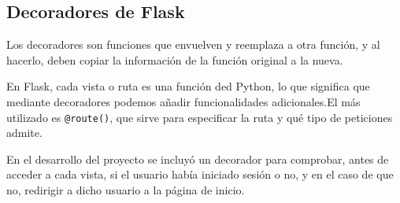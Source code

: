 \subsection{Decoradores de Flask}
Los decoradores son funciones que envuelven y reemplaza a otra función, y al hacerlo, deben copiar la información de la función original a la nueva.

En Flask, cada vista o ruta es una función ded Python, lo que significa que mediante decoradores podemos añadir funcionalidades adicionales.El más utilizado es \texttt{@route()}, que sirve para especificar la ruta y qué tipo de peticiones admite. 


En el desarrollo del proyecto se incluyó un decorador para comprobar, antes de acceder a cada vista, si el usuario había iniciado sesión o no, y en el caso de que no, redirigir a dicho usuario a la página de inicio. 

